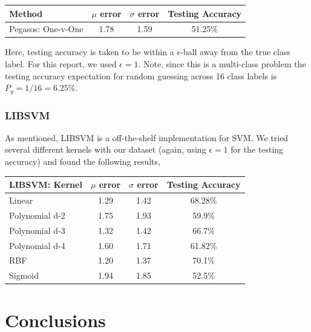 \documentclass[fleqn]{article}
\begin{document}
\begin{table}[htbp]
	\centering
		\begin{tabular}{ | l | c | c | c |}
  		\hline                        
  		\textbf{Method} & \textbf{$\mu$ error} & \textbf{$\sigma$ error} & \textbf{Testing Accuracy} \\ \hline
  		Pegasos: One-v-One & 1.78 & 1.59 & 51.25\% \\ \hline
		\end{tabular}
	\label{table:AccuracyPegasos}
\end{table}
Here, testing accuracy is taken to be within a $\epsilon$-ball away from the true class label.  For this report, we used $\epsilon = 1$.  Note, since this is a multi-class problem the testing accuracy expectation for random guessing across 16 class labels is $P_y = 1/16 = 6.25\%$.

\subsubsection{LIBSVM}
\label{subsub:LIBSVM}
As mentioned, LIBSVM\cite{LIBSVM} is a off-the-shelf implementation for SVM.  We tried several different kernels with our dataset (again, using $\epsilon = 1$ for the testing accuracy) and found the following results,

\begin{table}[htbp]
	\centering
		\begin{tabular}{ | l | c | c | c |}
  		\hline                        
  		\textbf{LIBSVM: Kernel} & \textbf{$\mu$ error} & \textbf{$\sigma$ error} & \textbf{Testing Accuracy} \\ \hline
  		 Linear & 1.29 & 1.42 & 68.28\% \\ \hline
  		 Polynomial d-2 & 1.75 & 1.93 & 59.9\% \\ \hline
  		 Polynomial d-3 & 1.32 & 1.42 & 66.7\% \\ \hline
  		 Polynomial d-4 & 1.60 & 1.71 & 61.82\% \\ \hline
  		 RBF & 1.20 & 1.37 & 70.1\% \\ \hline
  		 Sigmoid & 1.94 & 1.85 & 52.5\% \\ \hline
		\end{tabular}
	\label{table:AccuracyLIBSVM}
\end{table}

\section{Conclusions}
\label{sec:Conclusions}


 
\end{document}
